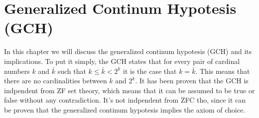 \section{Generalized Continum Hypotesis (GCH)}
In this chapter we will discuss the generalized continum hypotesis (GCH) and its implications. To put it simply, 
the GCH states that for every pair of cardinal numbers $k$ and $\bar{k}$ such that $k \leq \bar{k} < 2^k$ it is the case 
that $k = \bar{k}$. This means that there are no cardinalities between $k$ and $2^k$. It has been proven that the GCH is
indpendent from ZF set theory, which means that it can be assumed to be true or false without any contradiction. It's not indpendent
from ZFC tho, since it can be proven that the generalized continum hypotesis implies the axiom of choice.



\newpage